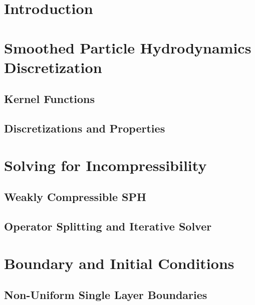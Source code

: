 \documentclass[oneside, a4paper]{book}
\begin{document}
\begin{titlepage}
\begin{center}
    \vspace{5.2cm}
  \end{center}
\end{titlepage}

\tableofcontents
\newpage


\chapter{Introduction}


\chapter{Smoothed Particle Hydrodynamics Discretization}\label{chp:sph-discretization}
\section{Kernel Functions}
\section{Discretizations and Properties}

\chapter{Solving for Incompressibility}
\section{Weakly Compressible SPH}
\section{Operator Splitting and Iterative Solver}

\chapter{Boundary and Initial Conditions}
\section{Non-Uniform Single Layer Boundaries}
\end{document}

